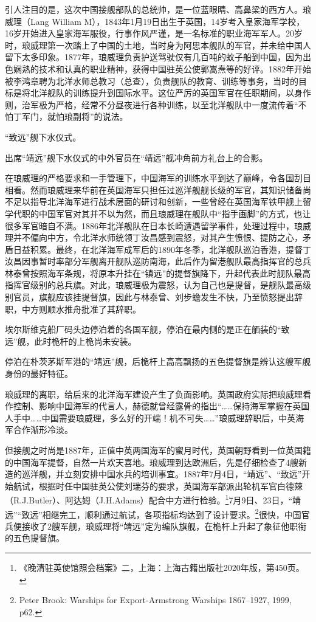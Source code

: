 \documentclass[12pt,UTF8]{ctexbook}
\begin{document}
引人注目的是，这次中国接舰部队的总统帅，是一位蓝眼睛、高鼻梁的西方人。琅威理（Lang William M），1843年1月19日出生于英国，14岁考入皇家海军学校，16岁开始进入皇家海军服役，行事作风严谨，是一名标准的职业海军军人。20岁时，琅威理第一次踏上了中国的土地，当时身为阿思本舰队的军官，并未给中国人留下太多印象。1877年，琅威理负责护送驾驶仅有几百吨的蚊子船到中国，因为出色娴熟的技术和认真的职业精神，获得中国驻英公使郭嵩焘等的好评。1882年开始被李鸿章聘为北洋水师总教习（总查），负责舰队的教育、训练等事务，当时的目标是将北洋舰队的训练提升到国际水平。这位严厉的英国军官在任职期间，以身作则，治军极为严格，经常不分昼夜进行各种训练，以至北洋舰队中一度流传着“不怕丁军门，就怕琅副将”的说法。

“致远”舰下水仪式。

出席“靖远”舰下水仪式的中外官员在“靖远”舰冲角前方礼台上的合影。

在琅威理的严格要求和一手管理下，中国海军的训练水平到达了巅峰，令各国刮目相看。然而琅威理来华前在英国海军只担任过巡洋舰舰长级的军官，其知识储备尚不足以指导北洋海军进行战术层面的研讨和创新，一些曾经在英国海军铁甲舰上留学代职的中国军官对其并不以为然，而且琅威理在舰队中“指手画脚”的方式，也让很多军官暗自不满。1886年北洋舰队在日本长崎遭遇留学事件，处理过程中，琅威理并不偏向中方，令北洋水师统领丁汝昌感到震怒，对其产生愤恨、提防之心，矛盾日益积累。最终，在北洋海军成军后的1890年冬季，北洋舰队巡泊香港，提督丁汝昌因事暂时率部分军舰离开舰队巡防南海，此后作为留港舰队最高指挥官的总兵林泰曾按照海军条规，将原本升挂在“镇远”的提督旗降下，升起代表此时舰队最高指挥官级别的总兵旗。对此，琅威理极为震怒，认为自己也是提督，是舰队最高级别官员，旗舰应该挂提督旗，因此与林泰曾、刘步蟾发生不快，乃至愤怒提出辞职，中方则顺水推舟批准了其辞职。

埃尔斯维克船厂码头边停泊着的各国军舰，停泊在最内侧的是正在舾装的“致远”舰，此时桅杆的上桅尚未安装。

停泊在朴茨茅斯军港的“靖远”舰，后桅杆上高高飘扬的五色提督旗是辨认这艘军舰身份的最好特征。

琅威理的离职，给后来的北洋海军建设产生了负面影响。英国政府实际把琅威理看作控制、影响中国海军的代言人，赫德就曾经露骨的指出“……保持海军掌握在英国人手中……中国需要琅威理，多么好的开端！机不可失……”琅威理辞职后，中英海军合作渐形冷淡。

但接舰之时尚是1887年，正值中英两国海军的蜜月时代，英国朝野看到一位英国籍的中国海军提督，自然一片欢天喜地。琅威理到达欧洲后，先是仔细检查了4艘新造的巡洋舰，并立刻安排中国水兵的培训事宜。1887年7月4日，“靖远”、“致远”开始航试，根据时任中国驻英公使刘瑞芬的要求，英国海军部派出轮机军官白德辣（R.J.Butler）、阿达姆（J.H.Adams）配合中方进行检验。\footnote{《晚清驻英使馆照会档案》二，上海：上海古籍出版社2020年版，第450页。}7月9日、23日，“靖远”“致远”相继完工，顺利通过航试，各项指标均达到了设计要求。\footnote{Peter Brook: Warships for Export-Armstrong Warships 1867--1927, 1999, p62.}很快，中国官兵便接收了2艘军舰，琅威理将“靖远”定为编队旗舰，在桅杆上升起了象征他职衔的五色提督旗。
\end{document}
